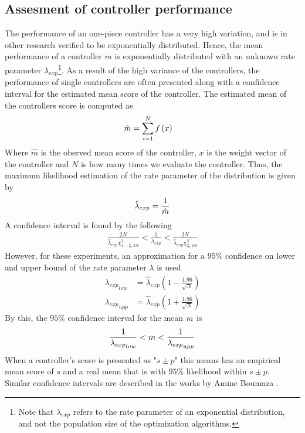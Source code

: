 \subsection{Assesment of controller performance \label{sec:confidenceIntervals}}
The performance of an one-piece controller has a very high variation,
and is in other research verified to be exponentially distributed. Hence, the mean
performance of a controller $m$ is exponentially distributed with an unknown 
rate parameter  $\lambda_{exp}$\footnote{Note that $\lambda_{exp}$ refers to the rate parameter
of an exponential distribution, and not the population size of the optimization algorithms.}.
As a result of the high variance of the controllers, the performance 
of single controllers are often presented along with a confidence interval
for the estimated mean score of the controller. The estimated mean of 
the controllers score is computed as
\begin{align}
\hat{m} &= \sum_{i=1}^{N} f \left( x \right)
\end{align}
Where $\hat{m}$ is the oberved mean score of the controller, $x$ is the
weight vector of the controller and $N$ is how many times we evaluate the controller.
Thus, the maximum likelihood estimation of the rate 
parameter
of the distribution is given by
\begin{align}
\hat{\lambda}_{exp} = \frac{1}{\hat{m}}
\end{align}
A confidence interval is found by the following
\begin{align}
\frac{2N}{\hat{\lambda}_{exp}\chi^{2}_{1-\frac{\alpha}{2},2N}}
<
\frac{1}{\lambda_{exp}}
< 
\frac{2N}{\hat{\lambda}_{exp}\chi^{2}_{\frac{\alpha}{2},2N}}
\end{align}
However, for these experiments, an approximation for a $95\%$
confidence on lower and upper bound 
of the rate parameter $\lambda$ is used
\begin{align}
{\lambda_{exp}}_{low} &= 
\hat{\lambda}_{exp} \left( 1 - \frac{1.96}{\sqrt{N}} \right)\\
{\lambda_{exp}}_{upp} &= 
\hat{\lambda}_{exp} \left( 1 + \frac{1.96}{\sqrt{N}} \right)
\end{align}
By this, the $95\%$ confidence interval for the mean $m$ is
\begin{align}
\frac{1}{{\lambda_{exp}}_{low}} < m < \frac{1}{{\lambda_{exp}}_{upp}}
\end{align}
When a controller's score is presented as "$s \pm p$" this means 
has an empirical mean score of $s$ and a real mean that is with 
$95\%$ likelihood within $s \pm p$. \\
Similar confidence intervals are described in the works by Amine Boumaza \citep{boumaza2009}.
